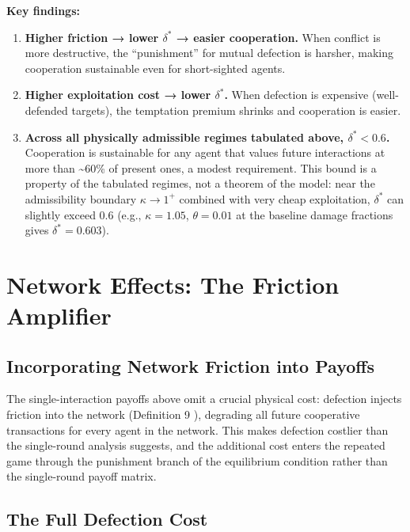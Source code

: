 \documentclass[11pt]{article}
\theoremstyle{plain}
\theoremstyle{definition}
\theoremstyle{remark}
\let\origsection\section
\renewcommand{\section}{\needspace{12\baselineskip}\origsection}
\let\origsubsection\subsection
\renewcommand{\subsection}{\needspace{7\baselineskip}\origsubsection}
\providecommand{\tightlist}{%
  \setlength{\itemsep}{0pt}\setlength{\parskip}{0pt}}
\begin{document}
\textbf{Key findings:}

\begin{enumerate}
\def\labelenumi{\arabic{enumi}.}
\tightlist
\item
  \textbf{Higher friction → lower \(\delta^*\) → easier cooperation.}
  When conflict is more destructive, the ``punishment'' for mutual
  defection is harsher, making cooperation sustainable even for
  short-sighted agents.
\item
  \textbf{Higher exploitation cost → lower \(\delta^*\).} When defection
  is expensive (well-defended targets), the temptation premium shrinks
  and cooperation is easier.
\item
  \textbf{Across all physically admissible regimes tabulated above,
  \(\delta^* < 0.6\).} Cooperation is sustainable for any agent that
  values future interactions at more than \textasciitilde60\% of present
  ones, a modest requirement. This bound is a property of the tabulated
  regimes, not a theorem of the model: near the admissibility boundary
  \(\kappa \to 1^+\) combined with very cheap exploitation, \(\delta^*\)
  can slightly exceed \(0.6\) (e.g., \(\kappa = 1.05\),
  \(\theta = 0.01\) at the baseline damage fractions gives
  \(\delta^* = 0.603\)).
\end{enumerate}

\section{Network Effects: The Friction
Amplifier}\label{network-effects-the-friction-amplifier}

\subsection{Incorporating Network Friction into
Payoffs}\label{incorporating-network-friction-into-payoffs}

The single-interaction payoffs above omit a crucial physical cost:
defection injects friction into the network (Definition 9
\citep{TC-IV}), degrading all future cooperative transactions for every
agent in the network. This makes defection costlier than the
single-round analysis suggests, and the additional cost enters the
repeated game through the punishment branch of the equilibrium condition
rather than the single-round payoff matrix.

\subsection{The Full Defection Cost}\label{the-full-defection-cost}
\end{document}
